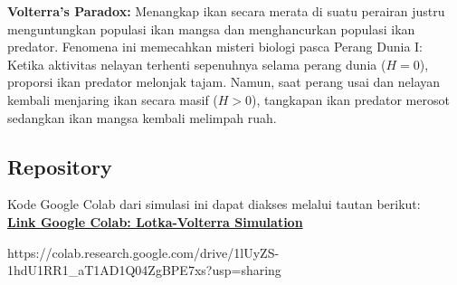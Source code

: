 \documentclass[12pt,a4paper]{article}
\begin{document}
\textbf{Volterra's Paradox:} Menangkap ikan secara merata di suatu perairan justru menguntungkan populasi ikan mangsa dan menghancurkan populasi ikan predator. Fenomena ini memecahkan misteri biologi pasca Perang Dunia I: Ketika aktivitas nelayan terhenti sepenuhnya selama perang dunia ($H=0$), proporsi ikan predator melonjak tajam. Namun, saat perang usai dan nelayan kembali menjaring ikan secara masif ($H>0$), tangkapan ikan predator merosot sedangkan ikan mangsa kembali melimpah ruah.

\subsection{Repository}
Kode Google Colab dari simulasi ini dapat diakses melalui tautan berikut:\\
\href{https://colab.research.google.com/drive/1lUyZS-1hdU1RR1_aT1AD1Q04ZgBPE7xs?usp=sharing}{\textbf{Link Google Colab: Lotka-Volterra Simulation}}

https://colab.research.google.com/drive/1lUyZS-1hdU1RR1_aT1AD1Q04ZgBPE7xs?usp=sharing
\end{document}
